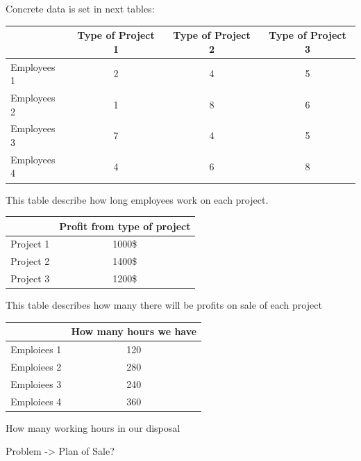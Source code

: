 \documentclass[a4paper,11pt]{scrartcl}
\begin{document}
Concrete data is set in  next tables:

\bigskip
\begin{tabular}{|l |c| c| c|}
\hline
& Type of Project 1 &  Type of Project 2 &  Type of Project 3 \\
\hline
Employees 1 &  2 & 4  & 5\\
\hline
Employees 2 & 1 & 8 & 6   \\
\hline
Employees 3 & 7 & 4 & 5  \\
\hline
Employees 4 & 4 & 6 & 8  \\
\hline
\end{tabular}

\bigskip

This table describe how long employees  work on each project.


\bigskip
\begin{tabular}{|l |c| }
\hline
 &  Profit from   type of project  \\
\hline
Project 1 &  1000\$  \\
\hline
Project 2 &  1400\$ \\
\hline
Project 3 &  1200\$  \\
\hline
\end{tabular}

\bigskip

This table describes how many there will be profits on sale of each project 
\bigskip

\begin{tabular}{|l |c| }
\hline
 & How many hours we have  \\
\hline
Emploiees 1 &  120 \\
\hline
Emploiees 2 & 280   \\
\hline
Emploiees 3 & 240  \\
\hline
Emploiees 4 & 360  \\
\hline
\end{tabular}

\bigskip

How many working hours in our disposal

\bigskip

Problem -> Plan of Sale?

\bigskip
\end{document}
